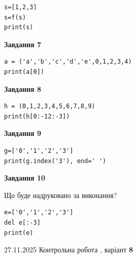 \documentclass[12pt, ukrainian]{article}
\begin{document}
{{{{{{{{\begin{minipage}[t]{10.5cm}
\begin{verbatim}
s=[1,2,3]
s=f(s)
print(s)
\end{verbatim}



\begin{center}
\textbf{Завдання 7}
\end{center}

\begin{verbatim}
a = ('a','b','c','d','e',0,1,2,3,4)
print(a[0])
\end{verbatim}



\begin{center}
\textbf{Завдання 8}
\end{center}

\begin{verbatim}
h = (0,1,2,3,4,5,6,7,8,9)
print(h[0:-12:-3])
\end{verbatim}



\begin{center}
\textbf{Завдання 9}
\end{center}

\begin{verbatim}
g=['0','1','2','3']
print(g.index('3'), end=' ')
\end{verbatim}



\begin{center}
\textbf{Завдання 10}
\end{center}
Що буде надруковано за виконання?\par
\begin{verbatim}
e=['0','1','2','3']
del e[:-3]
print(e)
\end{verbatim}

\end{minipage}

}
\newpage

{{ 27.11.2025 Контрольна робота , варіант  \No \textbf { 8 }\par}}
{

{%



}}}}}}}}}
\end{document}

